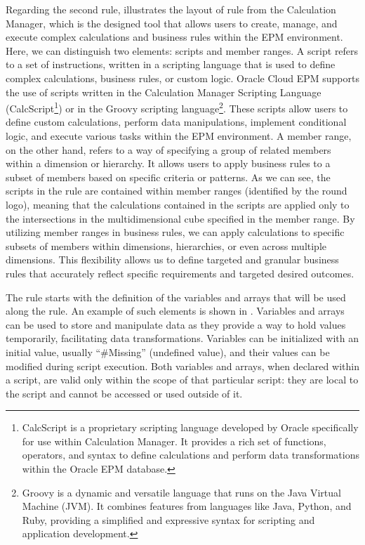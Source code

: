 \documentclass[12pt,a4paper,openright,twoside]{book}
\begin{document}
Regarding the second rule,  illustrates the layout of rule from the Calculation Manager, which is the designed tool that allows users to create, manage, and execute complex calculations and business rules within the EPM environment. 
%
Here, we can distinguish two elements: scripts and member ranges.
%
A script refers to a set of instructions, written in a scripting language that is used to define complex calculations, business rules, or custom logic.
%
Oracle Cloud EPM supports the use of scripts written in the Calculation Manager Scripting Language (CalcScript\footnote{CalcScript is a proprietary scripting language developed by Oracle specifically for use within Calculation Manager. It provides a rich set of functions, operators, and syntax to define calculations and perform data transformations within the Oracle EPM database.}) or in the Groovy scripting language\footnote{Groovy is a dynamic and versatile language that runs on the Java Virtual Machine (JVM). It combines features from languages like Java, Python, and Ruby, providing a simplified and expressive syntax for scripting and application development.}. 
%
These scripts allow users to define custom calculations, perform data manipulations, implement conditional logic, and execute various tasks within the EPM environment.
%
A member range, on the other hand, refers to a way of specifying a group of related members within a dimension or hierarchy.
%
It allows users to apply business rules to a subset of members based on specific criteria or patterns.
%
As we can see, the scripts in the rule are contained within member ranges (identified by the round logo), meaning that the calculations contained in the scripts are applied only to the intersections in the multidimensional cube specified in the member range.
%
By utilizing member ranges in business rules, we can apply calculations to specific subsets of members within dimensions, hierarchies, or even across multiple dimensions. 
%
This flexibility allows us to define targeted and granular business rules that accurately reflect specific requirements and targeted desired outcomes.



The rule starts with the definition of the variables and arrays that will be used along the rule.
%
An example of such elements is shown in .
%
Variables and arrays can be used to store and manipulate data as they provide a way to hold values temporarily, facilitating data transformations.
%
Variables can be initialized with an initial value, usually ``\#Missing'' (undefined value), and their values can be modified during script execution.
%
Both variables and arrays, when declared within a script, are valid only within the scope of that particular script: they are local to the script and cannot be accessed or used outside of it.
\end{document}
